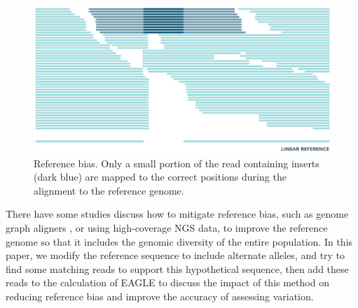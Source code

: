 \begin{figure}[H]
\includegraphics[width=1\columnwidth]{body/image/2-2.png}\vspace*{-1em}
\caption[Reference bias]{Reference bias. Only a small portion of the read containing inserts (dark blue) are mapped to the correct positions during the alignment to the reference genome.}
\label{f2-2}
\end{figure}
 

There have some studies discuss how to mitigate reference bias, such as genome graph aligners \cite{garrison2018variation,li2020design}, or using high-coverage NGS data, to improve the reference genome so that it includes the genomic diversity of the entire population.
In this paper, we modify the reference sequence to include alternate alleles, and try to find some matching reads to support this hypothetical sequence, then add these reads to the calculation of EAGLE to discuss the impact of this method on reducing reference bias and improve the accuracy of assessing variation.
